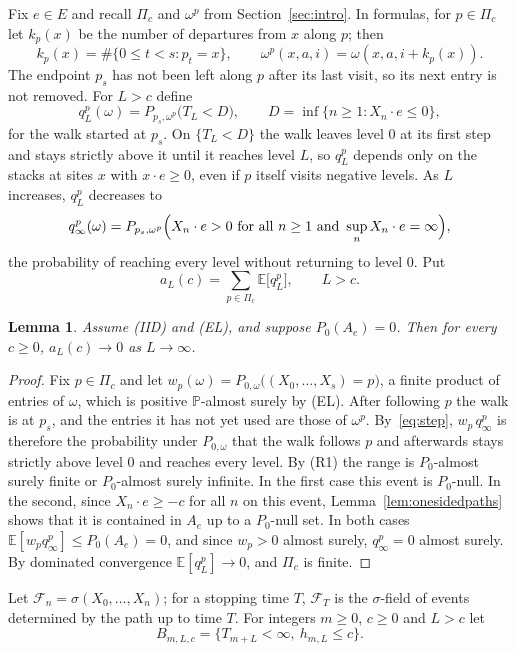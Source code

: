\documentclass[11pt]{amsart}
\newtheorem{lemma}[theorem]{Lemma}
\theoremstyle{remark}
\newcommand{\E}{\mathbb{E}}
\newcommand{\Prob}{\mathbb{P}}
\begin{document}
Fix $e\in E$ and recall $\Pi_c$ and $\omega^p$ from Section~\ref{sec:intro}. In formulas, for $p\in\Pi_c$ let $k_p(x)$
be the number of departures from $x$ along $p$; then
\[
k_p(x)=\#\{0\le t<s:p_t=x\},\qquad \omega^p(x,a,i)=\omega(x,a,i+k_p(x)).
\]
The endpoint $p_s$ has not been left along $p$ after its last visit, so its next entry is not removed. For $L>c$ define
\[
q_L^p(\omega)=P_{p_s,\omega^p}\bigl(T_L<D\bigr),\qquad D=\inf\{n\ge1:X_n\cdot e\le0\},
\]
for the walk started at $p_s$. On $\{T_L<D\}$ the walk leaves level $0$ at
its first step and stays strictly above it until it reaches level $L$, so $q_L^p$ depends only on the stacks at sites
$x$ with $x\cdot e\ge0$, even if $p$ itself visits negative levels. As $L$ increases, $q_L^p$ decreases to
\[
q_\infty^p(\omega)=P_{p_s,\omega^p}\Bigl(X_n\cdot e>0\text{ for all }n\ge1\text{ and }\sup_nX_n\cdot e=\infty\Bigr),
\]
the probability of reaching every level without returning to level $0$. Put
\[
a_L(c)=\sum_{p\in\Pi_c}\E\bigl[q_L^p\bigr],\qquad L>c .
\]

\begin{lemma}\label{lem:prefix}
Assume (IID) and (EL), and suppose $P_0(A_e)=0$. Then for every $c\ge0$, $a_L(c)\to0$ as $L\to\infty$.
\end{lemma}

\begin{proof}
Fix $p\in\Pi_c$ and let $w_p(\omega)=P_{0,\omega}\bigl((X_0,\dots,X_s)=p\bigr)$, a finite product of entries of
$\omega$, which is positive $\Prob$-almost surely by (EL). After following $p$ the walk is at $p_s$, and the entries it has
not yet used are those of $\omega^p$. By~\eqref{eq:step}, $w_p\,q_\infty^p$ is therefore the probability under
$P_{0,\omega}$ that the walk follows $p$ and afterwards stays strictly above level $0$ and reaches every level. By (R1) the range is $P_0$-almost surely finite or
$P_0$-almost surely infinite. In the first case this event is $P_0$-null. In the second, since $X_n\cdot e\ge-c$ for all $n$ on this event, Lemma~\ref{lem:onesidedpaths} shows
that it is contained in $A_e$ up to a $P_0$-null set. In both cases $\E[w_pq_\infty^p]\le P_0(A_e)=0$, and since
$w_p>0$ almost surely, $q_\infty^p=0$ almost surely. By dominated convergence $\E[q_L^p]\to0$, and $\Pi_c$ is finite.
\end{proof}

Let $\mathcal F_n=\sigma(X_0,\dots,X_n)$; for a stopping time $T$, $\mathcal F_T$ is the $\sigma$-field of events
determined by the path up to time $T$. For integers $m\ge0$, $c\ge0$ and $L>c$ let
\[
B_{m,L,c}=\{T_{m+L}<\infty,\ h_{m,L}\le c\}.
\]
\end{document}
